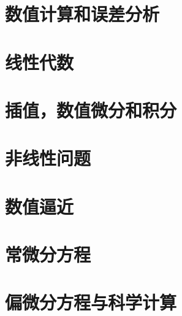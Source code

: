 \chapter{数值计算和误差分析}
\chapter{线性代数}
\chapter{插值，数值微分和积分}
\chapter{非线性问题}
\chapter{数值逼近}
\chapter{常微分方程}
\chapter{偏微分方程与科学计算}
